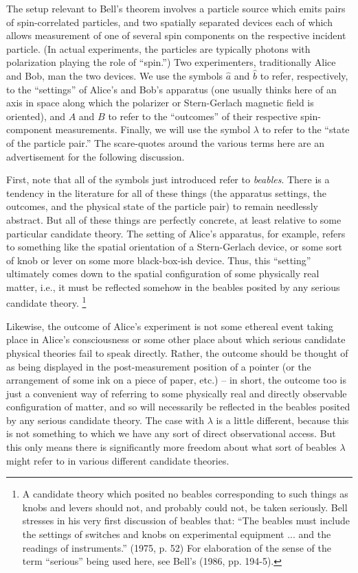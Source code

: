 \documentclass[12pt]{article}
\begin{document}
The setup relevant to Bell's theorem involves a particle source which
emits pairs of spin-correlated particles, and two spatially separated
devices each of which allows measurement of one of several spin
components on the respective incident particle.  (In actual
experiments, the particles are typically photons with polarization
playing the role of ``spin.'')  Two experimenters, traditionally
Alice and Bob, man the two devices.  We use the symbols
$\hat{a}$ and $\hat{b}$ to refer, respectively, to the ``settings'' of
Alice's and Bob's apparatus (one usually thinks here of an axis in
space along which the polarizer or Stern-Gerlach magnetic field is
oriented), and $A$ and $B$ to refer to the
``outcomes'' of their respective spin-component measurements.
Finally, we will use the symbol $\lambda$ to refer to the ``state of
the particle pair.''  The scare-quotes around the various terms here
are an advertisement for the following discussion.

First, note that all of the symbols just introduced refer to
\emph{beables}.  There is a tendency in the literature for all of
these things (the apparatus settings, the outcomes, and the physical
state of the particle pair) to remain needlessly abstract.  But all of
these things are perfectly concrete, at least relative to some
particular candidate theory.  The setting of Alice's
apparatus, for example, refers to something like the spatial
orientation of a Stern-Gerlach device, or some sort of knob or lever
on some more black-box-ish device.  Thus, this ``setting'' ultimately
comes down to the spatial configuration of some physically real
matter, i.e., it must be reflected somehow in the beables posited by
any serious candidate theory.%
\footnote{A candidate theory which posited no
beables corresponding to such things as knobs and levers should not,
and probably could not, be taken seriously.  Bell stresses in his very
first discussion of beables that:  ``The beables must include the
settings of switches and knobs on experimental equipment ... and the
readings of instruments.'' (1975, p. 52)  For elaboration of
the sense of the term ``serious'' being used here, see Bell's (1986,
pp. 194-5).}

Likewise, the outcome of
Alice's experiment is not some ethereal event taking place in Alice's
consciousness or some other place about which serious candidate physical
theories fail to speak directly.  Rather, the outcome should be
thought of as being displayed in the post-measurement position of a
pointer (or the arrangement of some ink on a piece of paper, etc.) -- in
short, the outcome too is just a convenient way of referring to some
physically real and directly observable configuration of matter, and
so will necessarily be reflected in the beables posited by any serious
candidate theory.  The case with $\lambda$ is a little different,
because this is not something to which we have any sort of direct 
observational access.  But this only means there is significantly more
freedom about what sort of beables $\lambda$ might refer to in various
different candidate theories. 
\end{document}
